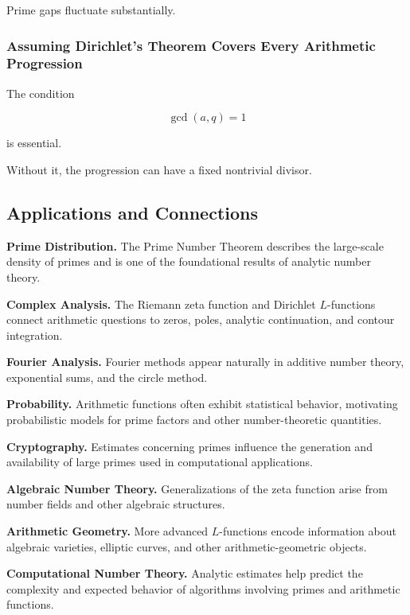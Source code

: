 Prime gaps fluctuate substantially.

\subsubsection{Assuming Dirichlet's Theorem Covers Every Arithmetic Progression}

The condition

\[ \gcd(a,q)=1 \]

is essential.

Without it, the progression can have a fixed nontrivial divisor.

\subsection{Applications and Connections}
\label{subsec:analytic-number-theory-applications}

\begin{applicationbox}
\textbf{Prime Distribution.}
The Prime Number Theorem describes the large-scale density of primes and is
one of the foundational results of analytic number theory.

\medskip

\textbf{Complex Analysis.}
The Riemann zeta function and Dirichlet \(L\)-functions connect arithmetic
questions to zeros, poles, analytic continuation, and contour integration.

\medskip

\textbf{Fourier Analysis.}
Fourier methods appear naturally in additive number theory, exponential
sums, and the circle method.

\medskip

\textbf{Probability.}
Arithmetic functions often exhibit statistical behavior, motivating
probabilistic models for prime factors and other number-theoretic quantities.

\medskip

\textbf{Cryptography.}
Estimates concerning primes influence the generation and availability of
large primes used in computational applications.

\medskip

\textbf{Algebraic Number Theory.}
Generalizations of the zeta function arise from number fields and other
algebraic structures.

\medskip

\textbf{Arithmetic Geometry.}
More advanced \(L\)-functions encode information about algebraic varieties,
elliptic curves, and other arithmetic-geometric objects.

\medskip

\textbf{Computational Number Theory.}
Analytic estimates help predict the complexity and expected behavior of
algorithms involving primes and arithmetic functions.
\end{applicationbox}

